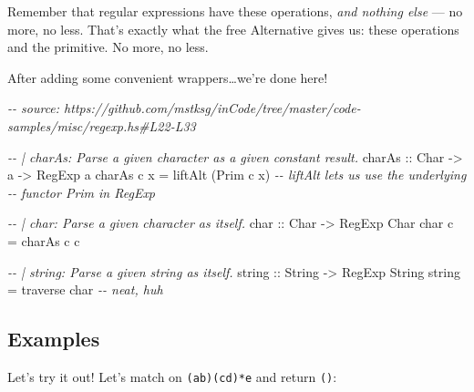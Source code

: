 \documentclass[]{article}
\newenvironment{Shaded}{}{}
\newcommand{\CharTok}[1]{\textcolor[rgb]{0.25,0.44,0.63}{#1}}
\newcommand{\CommentTok}[1]{\textcolor[rgb]{0.38,0.63,0.69}{\textit{#1}}}
\newcommand{\DataTypeTok}[1]{\textcolor[rgb]{0.56,0.13,0.00}{#1}}
\newcommand{\FunctionTok}[1]{\textcolor[rgb]{0.02,0.16,0.49}{#1}}
\newcommand{\NormalTok}[1]{#1}
\newcommand{\OperatorTok}[1]{\textcolor[rgb]{0.40,0.40,0.40}{#1}}
\newcommand{\OtherTok}[1]{\textcolor[rgb]{0.00,0.44,0.13}{#1}}
\newcommand{\StringTok}[1]{\textcolor[rgb]{0.25,0.44,0.63}{#1}}
\begin{document}
Remember that regular expressions have these operations, \emph{and nothing else}
--- no more, no less. That's exactly what the free Alternative gives us: these
operations and the primitive. No more, no less.

After adding some convenient wrappers\ldots we're done here!

\begin{Shaded}
\begin{Highlighting}[]
\CommentTok{{-}{-} source: https://github.com/mstksg/inCode/tree/master/code{-}samples/misc/regexp.hs\#L22{-}L33}

\CommentTok{{-}{-} | charAs: Parse a given character as a given constant result.}
\OtherTok{charAs ::} \DataTypeTok{Char} \OtherTok{{-}\textgreater{}}\NormalTok{ a }\OtherTok{{-}\textgreater{}} \DataTypeTok{RegExp}\NormalTok{ a}
\NormalTok{charAs c x }\OtherTok{=}\NormalTok{ liftAlt (}\DataTypeTok{Prim}\NormalTok{ c x)     }\CommentTok{{-}{-} liftAlt lets us use the underlying}
                                    \CommentTok{{-}{-} functor Prim in RegExp}

\CommentTok{{-}{-} | char: Parse a given character as itself.}
\OtherTok{char ::} \DataTypeTok{Char} \OtherTok{{-}\textgreater{}} \DataTypeTok{RegExp} \DataTypeTok{Char}
\NormalTok{char c }\OtherTok{=}\NormalTok{ charAs c c}

\CommentTok{{-}{-} | string: Parse a given string as itself.}
\OtherTok{string ::} \DataTypeTok{String} \OtherTok{{-}\textgreater{}} \DataTypeTok{RegExp} \DataTypeTok{String}
\NormalTok{string }\OtherTok{=} \FunctionTok{traverse}\NormalTok{ char              }\CommentTok{{-}{-} neat, huh}
\end{Highlighting}
\end{Shaded}

\subsection{Examples}\label{examples}

Let's try it out! Let's match on \texttt{(a\textbar{}b)(cd)*e} and return
\texttt{()}:

\begin{Shaded}
\end{Shaded}
\end{document}
